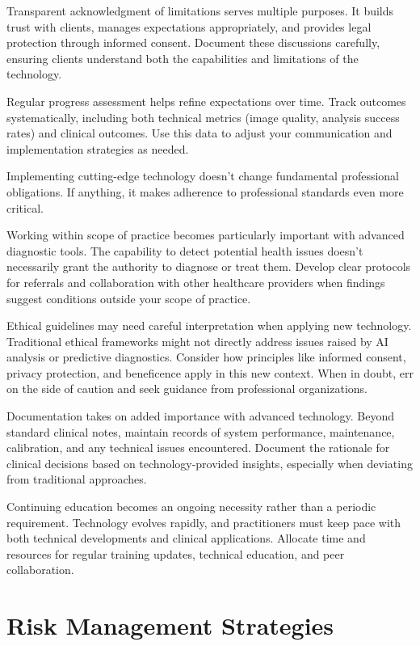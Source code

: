 \documentclass[
  Letterpaper,
]{scrbook}
\begin{document}
Transparent acknowledgment of limitations serves multiple purposes. It
builds trust with clients, manages expectations appropriately, and
provides legal protection through informed consent. Document these
discussions carefully, ensuring clients understand both the capabilities
and limitations of the technology.

Regular progress assessment helps refine expectations over time. Track
outcomes systematically, including both technical metrics (image
quality, analysis success rates) and clinical outcomes. Use this data to
adjust your communication and implementation strategies as needed.

Implementing cutting-edge technology doesn't change fundamental
professional obligations. If anything, it makes adherence to
professional standards even more critical.

Working within scope of practice becomes particularly important with
advanced diagnostic tools. The capability to detect potential health
issues doesn't necessarily grant the authority to diagnose or treat
them. Develop clear protocols for referrals and collaboration with other
healthcare providers when findings suggest conditions outside your scope
of practice.

Ethical guidelines may need careful interpretation when applying new
technology. Traditional ethical frameworks might not directly address
issues raised by AI analysis or predictive diagnostics. Consider how
principles like informed consent, privacy protection, and beneficence
apply in this new context. When in doubt, err on the side of caution and
seek guidance from professional organizations.

Documentation takes on added importance with advanced technology. Beyond
standard clinical notes, maintain records of system performance,
maintenance, calibration, and any technical issues encountered. Document
the rationale for clinical decisions based on technology-provided
insights, especially when deviating from traditional approaches.

Continuing education becomes an ongoing necessity rather than a periodic
requirement. Technology evolves rapidly, and practitioners must keep
pace with both technical developments and clinical applications.
Allocate time and resources for regular training updates, technical
education, and peer collaboration.

\section{Risk Management Strategies}\label{risk-management-strategies}
\end{document}
